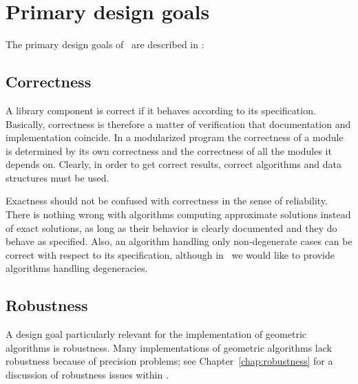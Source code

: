 
\section{Primary design goals\label{sec:design_goals}}
The primary design goals of \cgal\ are described in \cite{fgkss-dccga-00}:

\subsection*{Correctness}
A library component is correct if it behaves according to its
specification. 
Basically, correctness is therefore a matter of 
verification that documentation and implementation coincide.
In a modularized program the correctness of a module is determined 
by its own correctness and the correctness of all the modules it depends on.  
Clearly, in order to get correct results, correct algorithms and data 
structures must be used. 

Exactness should not be confused with correctness in the sense of
reliability. There is nothing wrong with algorithms computing approximate 
solutions instead of exact solutions, as long as their 
behavior is clearly documented and they do behave as specified.
Also, an algorithm handling only non-degenerate cases can be
correct with respect to its specification, although in \cgal\ we would
like to provide algorithms handling degeneracies. 

\subsection*{Robustness}
A design goal particularly relevant for the implementation of
geometric algorithms is robustness.  Many implementations of geometric
algorithms lack robustness because of precision problems; see 
Chapter~\ref{chap:robustness} for a discussion of robustness issues within 
\cgal.

